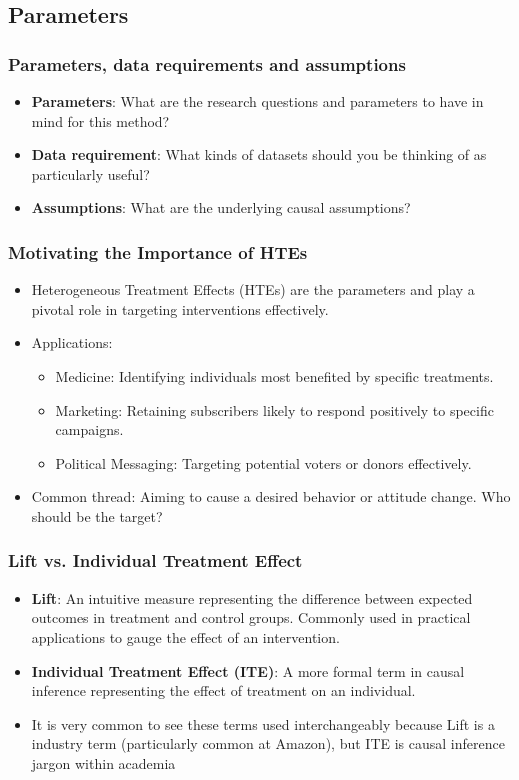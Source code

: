 \documentclass{beamer}
\begin{document}
\subsection{Parameters}


\begin{frame}
\frametitle{Parameters, data requirements and assumptions}
\begin{itemize}
	\item \textbf{Parameters}: What are the research questions and parameters to have in mind for this method?
	\item \textbf{Data requirement}: What kinds of datasets should you be thinking of as particularly useful?
	\item \textbf{Assumptions}: What are the underlying causal assumptions?

\end{itemize}
\end{frame}




\begin{frame}
\frametitle{Motivating the Importance of HTEs}
\begin{itemize}
    \item Heterogeneous Treatment Effects (HTEs) are the parameters and play a pivotal role in targeting interventions effectively.
    \item Applications:
    \begin{itemize}
        \item Medicine: Identifying individuals most benefited by specific treatments.
        \item Marketing: Retaining subscribers likely to respond positively to specific campaigns.
        \item Political Messaging: Targeting potential voters or donors effectively.
    \end{itemize}
    \item Common thread: Aiming to cause a desired behavior or attitude change. Who should be the target?
\end{itemize}
\end{frame}

\begin{frame}
\frametitle{Lift vs. Individual Treatment Effect}
\begin{itemize}
    \item \textbf{Lift}: An intuitive measure representing the difference between expected outcomes in treatment and control groups. Commonly used in practical applications to gauge the effect of an intervention.
    \item \textbf{Individual Treatment Effect (ITE)}: A more formal term in causal inference representing the effect of treatment on an individual.
    \item It is very common to see these terms used interchangeably because Lift is a industry term (particularly common at Amazon), but ITE is causal inference jargon within academia
\end{itemize}
\end{frame}
\end{document}
